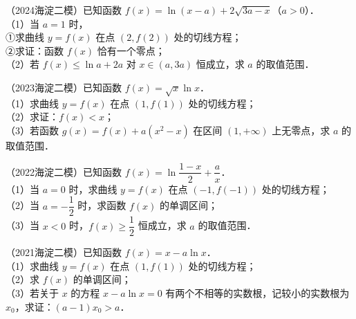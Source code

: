 \begin{example}
（2024海淀二模）已知函数 $f(x)=\ln(x-a)+2\sqrt{3a-x}$（$a>0$）．\\
（1）当 $a=1$ 时，\\
①求曲线 $y=f(x)$ 在点 $(2,f(2))$ 处的切线方程；\\
②求证：函数 $f(x)$ 恰有一个零点；\\
（2）若 $f(x)\leqslant\ln a+2a$ 对 $x\in(a,3a)$ 恒成立，求 $a$ 的取值范围．
\end{example}

\begin{example}
（2023海淀二模）已知函数 $f(x)=\sqrt{x}\ln x$．\\
（1）求曲线 $y=f(x)$ 在点 $(1,f(1))$ 处的切线方程；\\
（2）求证：$f(x)<x$；\\
（3）若函数 $g(x)=f(x)+a(x^2-x)$ 在区间 $(1,+\infty)$ 上无零点，求 $a$ 的取值范围．
\end{example}

\begin{example}
（2022海淀二模）已知函数 $f(x)=\ln\dfrac{1-x}{2}+\dfrac ax$．\\
（1）当 $a=0$ 时，求曲线 $y=f(x)$ 在点 $(-1,f(-1))$ 处的切线方程；\\
（2）当 $a=-\dfrac12$ 时，求函数 $f(x)$ 的单调区间；\\
（3）当 $x<0$ 时，$f(x)\geqslant\dfrac12$ 恒成立，求 $a$ 的取值范围．
\end{example}

\begin{example}
（2021海淀二模）已知函数 $f(x)=x-a\ln x$．\\
（1）求曲线 $y=f(x)$ 在点 $(1,f(1))$ 处的切线方程；\\
（2）求 $f(x)$ 的单调区间；\\
（3）若关于 $x$ 的方程 $x-a\ln x=0$ 有两个不相等的实数根，记较小的实数根为 $x_0$，求证：$(a-1)x_0>a$．
\end{example}
